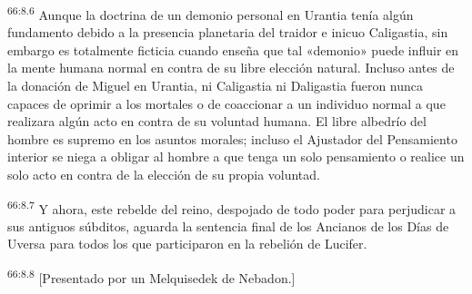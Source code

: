 \par
\textsuperscript{66:8.6} Aunque la doctrina de un demonio personal en Urantia tenía algún fundamento debido a la presencia planetaria del traidor e inicuo Caligastia, sin embargo es totalmente ficticia cuando enseña que tal «demonio» puede influir en la mente humana normal en contra de su libre elección natural. Incluso antes de la donación de Miguel en Urantia, ni Caligastia ni Daligastia fueron nunca capaces de oprimir a los mortales o de coaccionar a un individuo normal a que realizara algún acto en contra de su voluntad humana. El libre albedrío del hombre es supremo en los asuntos morales; incluso el Ajustador del Pensamiento interior se niega a obligar al hombre a que tenga un solo pensamiento o realice un solo acto en contra de la elección de su propia voluntad.

\par
\textsuperscript{66:8.7} Y ahora, este rebelde del reino, despojado de todo poder para perjudicar a sus antiguos súbditos, aguarda la sentencia final de los Ancianos de los Días de Uversa para todos los que participaron en la rebelión de Lucifer.

\par
\textsuperscript{66:8.8} [Presentado por un Melquisedek de Nebadon.]